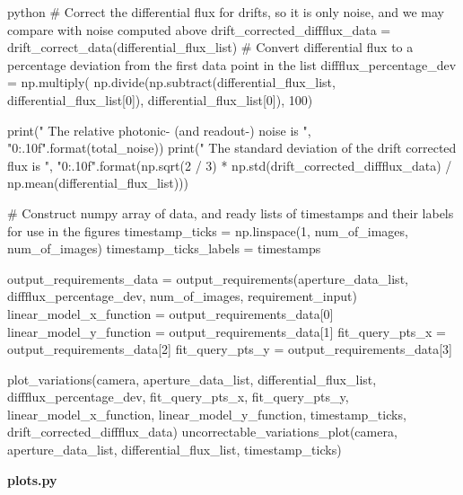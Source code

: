 \documentclass[../main.tex]{subfiles}
\begin{document}
\begin{mintedbox}{python}
# Correct the differential flux for drifts, so it is only noise, and we may compare with noise computed above
drift_corrected_diffflux_data  =  drift_correct_data(differential_flux_list)
# Convert differential flux to a percentage deviation from the first data point in the list
diffflux_percentage_dev  =  np.multiply(
np.divide(np.subtract(differential_flux_list, differential_flux_list[0]), differential_flux_list[0]), 100)

print(" The relative photonic- (and readout-) noise is ", "{0:.10f}".format(total_noise))
print(" The standard deviation of the drift corrected flux is ",
"{0:.10f}".format(np.sqrt(2 / 3) * np.std(drift_corrected_diffflux_data) / np.mean(differential_flux_list)))

# Construct numpy array of data, and ready lists of timestamps and their labels for use in the figures
timestamp_ticks  =  np.linspace(1, num_of_images, num_of_images)
timestamp_ticks_labels  =  timestamps

output_requirements_data  =  output_requirements(aperture_data_list, diffflux_percentage_dev, num_of_images,
requirement_input)
linear_model_x_function  =  output_requirements_data[0]
linear_model_y_function  =  output_requirements_data[1]
fit_query_pts_x  =  output_requirements_data[2]
fit_query_pts_y  =  output_requirements_data[3]

plot_variations(camera, aperture_data_list, differential_flux_list, diffflux_percentage_dev, fit_query_pts_x,
fit_query_pts_y, linear_model_x_function, linear_model_y_function, timestamp_ticks,
drift_corrected_diffflux_data)
uncorrectable_variations_plot(camera, aperture_data_list, differential_flux_list, timestamp_ticks)
\end{mintedbox}
\clearpage
\textbf{plots.py}
\end{document}
